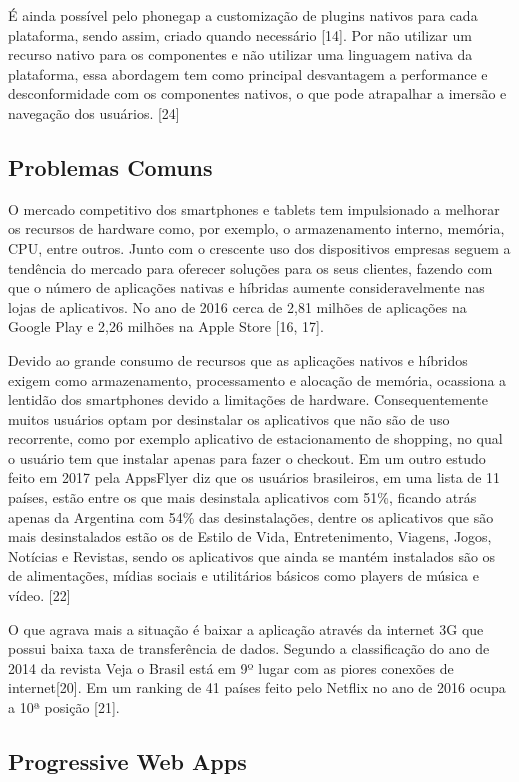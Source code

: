 É ainda possível pelo phonegap a customização de plugins nativos para cada plataforma, sendo assim, criado quando necessário [14]. Por não utilizar um recurso nativo para os componentes e não utilizar uma linguagem nativa da plataforma, essa abordagem tem como principal desvantagem a performance e desconformidade com os componentes nativos, o que pode atrapalhar a imersão e navegação dos usuários. [24]

\subsection{\esp Problemas Comuns}

O mercado competitivo dos smartphones e tablets tem impulsionado a melhorar os recursos de hardware como, por exemplo, o armazenamento interno, memória, CPU, entre outros. Junto com o crescente uso dos dispositivos empresas seguem a tendência do mercado para oferecer soluções para os seus clientes, fazendo com que o número de aplicações nativas e híbridas aumente consideravelmente nas lojas de aplicativos. No ano de 2016 cerca de 2,81 milhões de aplicações na Google Play e 2,26 milhões na Apple Store [16, 17].

Devido ao grande consumo de recursos que as aplicações nativos e híbridos exigem como armazenamento, processamento e alocação de memória, ocassiona a lentidão dos smartphones devido a limitações de hardware. Consequentemente muitos usuários optam por desinstalar os aplicativos que não são de uso recorrente, como por exemplo aplicativo de estacionamento de shopping, no qual o usuário tem que instalar apenas para fazer o checkout. Em um outro estudo feito em 2017 pela AppsFlyer diz que os usuários brasileiros, em uma lista de 11 países, estão entre os que mais desinstala aplicativos com 51\%, ficando atrás apenas da Argentina com 54\% das desinstalações, dentre os aplicativos que são mais desinstalados estão os de Estilo de Vida, Entretenimento, Viagens, Jogos, Notícias e Revistas, sendo os aplicativos que ainda se mantém instalados são os de alimentações, mídias sociais e utilitários básicos como players de música e vídeo. [22]

O que agrava mais a situação é baixar a aplicação através da internet 3G que possui baixa taxa de transferência de dados. Segundo a classificação do ano de 2014 da revista Veja o Brasil está em 9º lugar com as piores conexões de internet[20]. Em um ranking de 41 países feito pelo Netflix no ano de 2016 ocupa a 10ª posição [21].


\subsection{\esp Progressive Web Apps}

